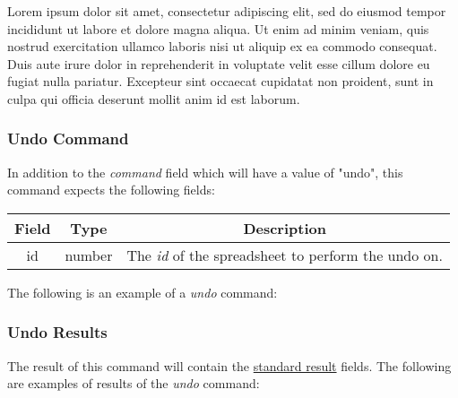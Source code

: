 Lorem ipsum dolor sit amet, consectetur adipiscing elit, sed do eiusmod tempor incididunt ut labore et dolore magna aliqua. Ut enim ad minim veniam, quis nostrud exercitation ullamco laboris nisi ut aliquip ex ea commodo consequat. Duis aute irure dolor in reprehenderit in voluptate velit esse cillum dolore eu fugiat nulla pariatur. Excepteur sint occaecat cupidatat non proident, sunt in culpa qui officia deserunt mollit anim id est laborum.

\subsubsection{Undo Command}
In addition to the \emph{command} field which will have a value of "undo", this command expects the following fields:
\begin{table}[H]
    \begin{center}
        \begin{tabular}{|c|c|c|}\hline
            Field & Type & Description \\\hline
            id & number & The \emph{id} of the spreadsheet to perform the undo on. \\\hline
        \end{tabular}
    \end{center}
\end{table}

The following is an example of a \emph{undo} command:


\subsubsection{Undo Results}
The result of this command will contain the \hyperref[sec:message:result]{standard result} fields.
The following are examples of results of the \emph{undo} command:




